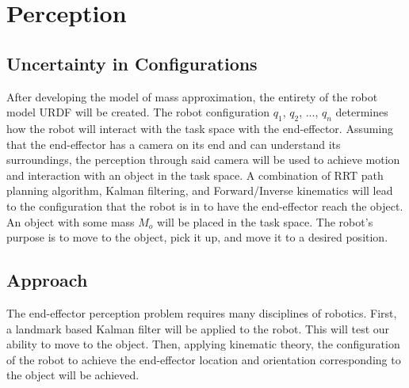 \section{Perception}
\subsection{Uncertainty in Configurations}
After developing the model of mass approximation, the entirety of the robot model URDF will be created. The robot configuration $q_1$, $q_2$, ..., $q_n$ determines how the robot will interact with the task space with the end-effector.  Assuming that the end-effector has a camera on its end and can understand its surroundings, the perception through said camera will be used to achieve motion and interaction with an object in the task space.  A combination of RRT path planning algorithm, Kalman filtering, and Forward/Inverse kinematics will lead to the configuration that the robot is in to have the end-effector reach the object.  An object with some mass $M_o$ will be placed in the task space.  The robot's purpose is to move to the object, pick it up, and move it to a desired position.

\subsection{Approach}
The end-effector perception problem requires many disciplines of robotics.  First, a landmark based Kalman filter will be applied to the robot.  This will test our ability to move to the object.  Then, applying kinematic theory, the configuration of the robot to achieve the end-effector location and orientation corresponding to the object will be achieved.